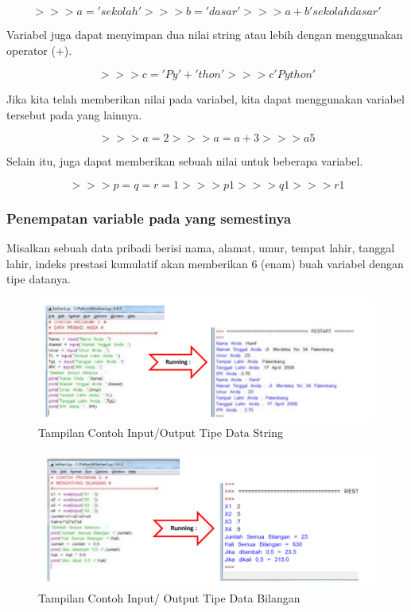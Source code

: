 \begin{equation}
>>>a = 'sekolah'
>>>b = 'dasar'
>>>a + b
'sekolahdasar'
\end{equation}

Variabel juga dapat menyimpan dua nilai string atau lebih dengan menggunakan operator (+).

\begin{equation}
>>>c = 'Py' + 'thon'
>>>c
'Python'
\end{equation}

Jika kita telah memberikan nilai pada variabel, kita dapat menggunakan variabel tersebut pada yang lainnya.

\begin{equation}
>>>a = 2
>>>a = a + 3
>>>a
5
\end{equation}

Selain itu, juga dapat memberikan sebuah nilai untuk beberapa variabel.

\begin{equation}
>>>p=q=r=1
>>>p
1
>>>q
1
>>>r
1
\end{equation}

\subsubsection{Penempatan variable pada yang semestinya}
Misalkan sebuah data pribadi berisi nama, alamat, umur, tempat lahir, tanggal lahir, indeks prestasi kumulatif akan memberikan 6 (enam) buah variabel dengan tipe datanya.
\begin{figure}[ht]
	\centerline{\includegraphics[width=1\textwidth]{figures/tipedatastring.png}}
	\caption{Tampilan Contoh Input/Output Tipe Data String}
	\label{tipedatastring}
	\end{figure}

\begin{figure}[ht]
	\centerline{\includegraphics[width=1\textwidth]{figures/tipedatabilangan.png}}
	\caption{Tampilan Contoh Input/ Output Tipe Data Bilangan}
	\label{tipedatabilangan}
	\end{figure}

